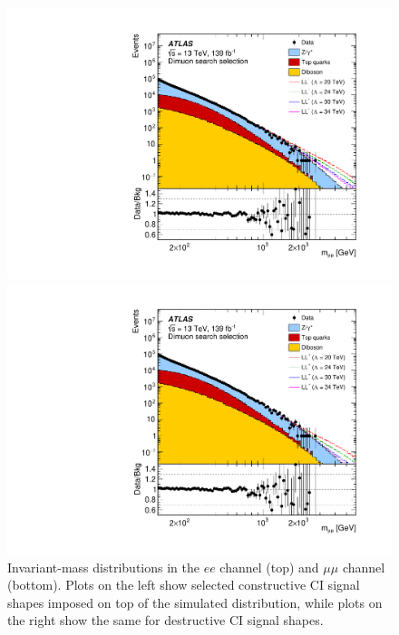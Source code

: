 \begin{figure}[h!]
\begin{minipage}[b]{.45\linewidth}
    \includegraphics[width=1\textwidth]{figures/ci/dataMc/figaux_06a.pdf}
    \subcaption{}
\end{minipage}
\begin{minipage}[b]{.45\linewidth}
    \includegraphics[width=1\textwidth]{figures/ci/dataMc/figaux_06b.pdf}
    \subcaption{}
\end{minipage}
\caption{Invariant-mass distributions in the $ee$ channel (top) and $\mu\mu$ channel (bottom). Plots on the left show selected constructive CI signal shapes imposed on top of the simulated distribution, while plots on the right show the same for destructive CI signal shapes.}
\label{fig:}
\end{figure}

